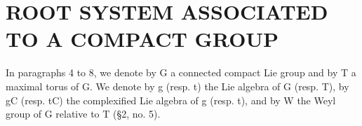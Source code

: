 \section{ROOT SYSTEM ASSOCIATED TO A COMPACT GROUP}

In paragraphs 4 to 8, we denote by G a connected compact Lie group and by T a maximal torus of G. We denote by g (resp. t) the Lie algebra of G (resp. T), by gC (resp. tC) the complexified Lie algebra of g (resp. t), and by W the Weyl group of G relative to T (§2, no. 5).

